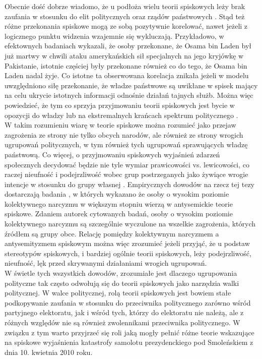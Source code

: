 \documentclass[man]{apa6}
\begin{document}
	Obecnie dość dobrze wiadomo, że u podłoża wielu teorii spiskowych leży brak zaufania w stosunku do elit politycznych oraz rządów państwowych \parencite[zob. przegląd w,][]{van2014power}. Stąd też różne przekonania spiskowe mogą ze sobą pozytywnie korelować, nawet jeżeli z logicznego punktu widzenia wzajemnie się wykluczają. Przykładowo, \textcite{wood2012dead} w efektownych badaniach wykazali, że osoby przekonane, że Osama bin Laden był już martwy w chwili ataku amerykańskich sił specjalnych na jego kryjówkę w Pakistanie, istotnie częściej były przekonane również co do tego, że Osama bin Laden nadal żyje. Co istotne ta obserwowana korelacja znikała jeżeli w modelu uwzględniono siłę przekonanie, że władze państwowe są uwikłane w spisek mający na celu ukrycie istotnych informacji odnośnie działań tajnych służb. Można więc powiedzieć, że tym co sprzyja przyjmowaniu teorii spiskowych jest bycie w opozycji do władzy lub na ekstremalnych krańcach spektrum politycznego \parencite[patrz, np.,][]{inglehart1987extremist}.\\
	W takim rozumieniu wiarę w teorie spiskowe można rozumieć jako przejaw zagrożenia ze strony nie tylko obcych narodów, ale również ze strony wrogich ugrupowań politycznych, w tym również tych ugrupowań sprawujących władzę państwową. Co więcej, o przyjmowaniu spiskowych wyjaśnień zdarzeń społecznych decydować będzie nie tyle wymiar prawicowości vs. lewicowości, co raczej nieufność i podejrzliwość wobec grup postrzeganych jako żywiące wrogie intencje w stosunku do grupy własnej \parencite{prooijen2015mutual}. Empirycznych dowodów na rzecz tej tezy dostarczają badania \textcite{golec2012collective}, w których wykazano że osoby o wysokim poziomie kolektywnego narcyzmu w większym stopniu wierzą w antysemickie teorie spiskowe. Zdaniem autorek cytowanych badań, osoby o wysokim poziomie kolektywnego narcyzmu są szczególnie wyczulone na wszelkie zagrożenia, których źródłem są grupy obce. Relację pomiędzy kolektywnym narcyzmem a antysemityzmem spiskowym można więc zrozumieć jeżeli przyjąć, że u podstaw stereotypów spiskowych, i bardziej ogólnie teorii spiskowych, leży podejrzliwość, nieufność, lęk przed skrywanymi działaniami wrogich ugrupowań.\\
	W świetle tych wszystkich dowodów, zrozumiałe jest dlaczego ugrupowania polityczne tak często odwołują się do teorii spiskowych jako narzędzia walki politycznej. W walce politycznej, rolą teorii spiskowych jest bowiem stałe podkopywanie zaufania w stosunku do przeciwnika politycznego zarówno wśród partyjnego elektoratu, jak i wśród tych, którzy do elektoratu nie należą, ale z różnych względów nie są również zwolennikami przeciwnika politycznego. W związku z tym warto przyjrzeć się roli jaką mogły pełnić różne teorie wskazujące na spiskowe wyjaśnienia katastrofy samolotu prezydenckiego pod Smoleńskiem z dnia 10. kwietnia 2010 roku.\\
\end{document}

